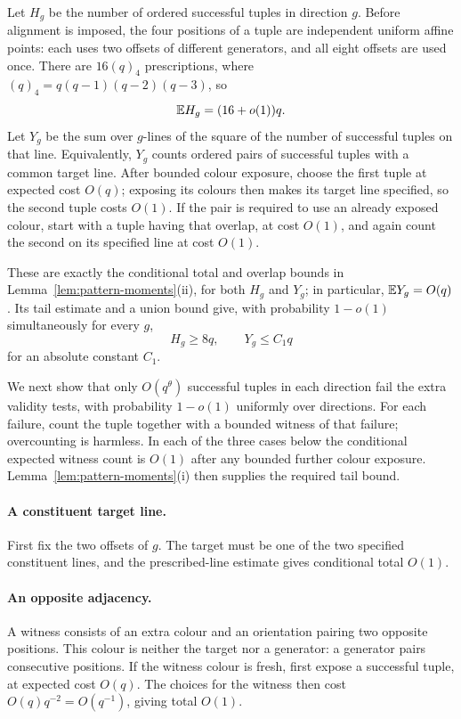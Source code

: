 Let $H_g$ be the number of ordered successful tuples in direction $g$.
Before alignment is imposed, the four positions of a tuple are
independent uniform affine points: each uses two offsets of different
generators, and all eight offsets are used once. There are
$16(q)_4$ prescriptions, where $(q)_4=q(q-1)(q-2)(q-3)$, so
\[
 \mathbb E H_g=(16+o(1))q.
\]
Let $Y_g$ be the sum over $g$-lines of the square of the number of
successful tuples on that line. Equivalently, $Y_g$ counts ordered pairs
of successful tuples with a common target line. After bounded colour
exposure, choose the first tuple at expected cost $O(q)$; exposing its
colours then makes its target line specified, so the second tuple costs
$O(1)$. If the pair is required to use an already exposed colour, start
with a tuple having that overlap, at cost $O(1)$, and again count the
second on its specified line at cost $O(1)$.

These are exactly the conditional total and overlap bounds in
Lemma~\ref{lem:pattern-moments}(ii), for both $H_g$ and $Y_g$;
in particular, $\mathbb E Y_g=O(q)$. Its tail estimate and a union bound give,
with probability $1-o(1)$ simultaneously for every $g$,
\begin{equation}\label{eq:tuple-counts}
 H_g\ge8q,\qquad Y_g\le C_1q
\end{equation}
for an absolute constant $C_1$.

We next show that only $O(q^\theta)$ successful tuples in each direction
fail the extra validity tests, with probability $1-o(1)$ uniformly over
directions. For each failure, count the tuple together with a bounded
witness of that failure; overcounting is harmless. In each of the three
cases below the conditional expected witness count is $O(1)$ after any
bounded further colour exposure. Lemma~\ref{lem:pattern-moments}(i)
then supplies the required tail bound.

\paragraph{A constituent target line.}
First fix the two offsets of $g$. The target must be one of the two
specified constituent lines, and the prescribed-line estimate gives
conditional total $O(1)$.

\paragraph{An opposite adjacency.}
A witness consists of an extra colour and an orientation pairing two
opposite positions. This colour is neither the target nor a generator:
a generator pairs consecutive positions. If the witness colour is fresh,
first expose a successful tuple, at expected cost $O(q)$. The choices
for the witness then cost $O(q)q^{-2}=O(q^{-1})$, giving total $O(1)$.

